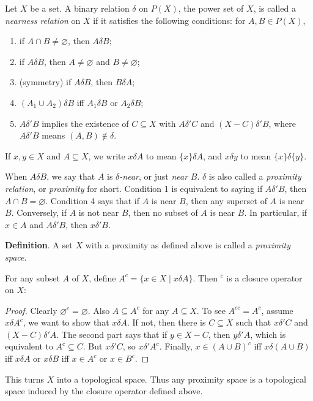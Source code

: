 \documentclass[12pt]{article}
\begin{document}
Let $X$ be a set.  A binary relation $\delta$ on $P(X)$, the power set of $X$, is called a \emph{nearness relation} on $X$ if it satisfies the following conditions: for $A,B\in P(X)$,
\begin{enumerate}
\item if $A\cap B\ne \varnothing$, then $A\delta B$;
\item if $A\delta B$, then $A\ne \varnothing$ and $B\ne \varnothing$;
\item (symmetry) if $A\delta B$, then $B\delta A$;
\item $(A_1\cup A_2)\delta B$ iff $A_1\delta B$ or $A_2\delta B$;
\item $A\delta'B$ implies the existence of $C \subseteq X$ with $A\delta'C$ and $(X-C)\delta'B$, where $A\delta'B$ means $(A,B)\notin \delta$.
\end{enumerate}

If $x,y\in X$ and $A\subseteq X$, we write $x\delta A$ to mean $\lbrace x\rbrace \delta A$, and $x\delta y$ to mean $\lbrace x\rbrace \delta \lbrace y \rbrace$.

When $A\delta B$, we say that $A$ is \emph{$\delta$-near}, or just \emph{near} $B$.  $\delta$ is also called a \emph{proximity relation}, or \emph{proximity} for short.  Condition 1 is equivalent to saying if $A\delta'B$, then $A\cap B=\varnothing$.  Condition 4 says that if $A$ is near $B$, then any superset of $A$ is near $B$.  Conversely, if $A$ is not near $B$, then no subset of $A$ is near $B$.  In particular, if $x\in A$ and $A\delta' B$, then $x\delta'B$.

\textbf{Definition}.  A set $X$ with a proximity as defined above is called a \emph{proximity space}.

For any subset $A$ of $X$, define $A^c=\lbrace x\in X\mid x\delta A\rbrace$.  Then $^c$ is a closure operator on $X$:
\begin{proof}
Clearly $\varnothing^c=\varnothing$.  Also $A\subseteq A^c$ for any $A\subseteq X$.  To see $A^{cc}=A^c$, assume $x\delta A^c$, we want to show that $x\delta A$.  If not, then there is $C\subseteq X$ such that $x\delta'C$ and $(X-C)\delta'A$.  The second part says that if $y\in X-C$, then $y\delta'A$, which is equivalent to $A^c \subseteq C$.  But $x\delta'C$, so $x\delta'A^c$.  Finally, $x\in (A\cup B)^c$ iff $x\delta (A\cup B)$ iff $x\delta A$ or $x\delta B$ iff $x\in A^c$ or $x\in B^c$.\end{proof}
This turns $X$ into a topological space.  Thus any proximity space is a topological space induced by the closure operator defined above.
\end{document}
